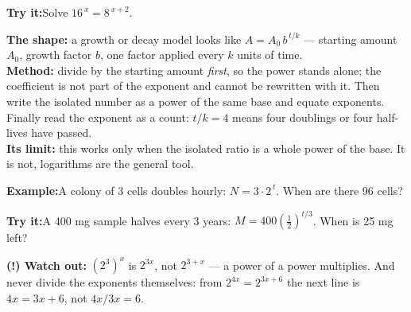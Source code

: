 \documentclass[12pt]{article}
\begin{document}
\begin{tryitbox}
\textbf{Try it:}\quad Solve $16^{\,x} = 8^{\,x+2}$.\\[2pt]
\end{tryitbox}


\begin{formulabox}
\textbf{The shape:} a growth or decay model looks like $A = A_0\,b^{\,t/k}$ ---
starting amount $A_0$, growth factor $b$, one factor applied every $k$ units of
time.\\[3pt]
\textbf{Method:} divide by the starting amount \emph{first}, so the power stands
alone; the coefficient is not part of the exponent and cannot be rewritten with
it. Then write the isolated number as a power of the same base and equate
exponents. Finally read the exponent as a count: $t/k = 4$ means four doublings
or four half-lives have passed.\\[3pt]
\textbf{Its limit:} this works only when the isolated ratio is a whole power of
the base. It is not, logarithms are the general tool.
\end{formulabox}

\begin{examplebox}
\textbf{Example:}\quad A colony of 3 cells doubles hourly: $N = 3\cdot 2^{\,t}$. When are there 96 cells?
\end{examplebox}

\begin{tryitbox}
\textbf{Try it:}\quad A 400 mg sample halves every 3 years:
$M = 400\left(\tfrac{1}{2}\right)^{t/3}$. When is 25 mg left?\\[2pt]
\end{tryitbox}

\begin{watchoutbox}
\textbf{(!) Watch out:} $\left(2^{3}\right)^{x}$ is $2^{3x}$, not $2^{3+x}$ --- a
power of a power multiplies. And never divide the exponents themselves: from
$2^{4x} = 2^{3x+6}$ the next line is $4x = 3x + 6$, not $4x/3x = 6$.
\end{watchoutbox}
\end{document}
